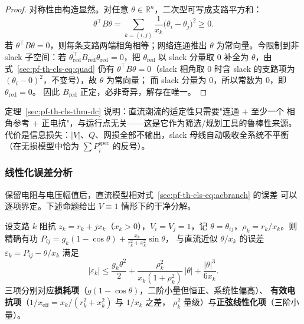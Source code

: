 \begin{proof}
对称性由构造显然。对任意 $\theta\in\mathbb R^{n}$，二次型可写成支路平方和：
\begin{equation}
\theta^{\top}B\theta=\sum_{k=(i,j)}\frac{1}{x_k}\bigl(\theta_i-\theta_j\bigr)^2\ge0.
\label{sec:pf-th-cls-eq:quad}
\end{equation}
若 $\theta^{\top}B\theta=0$，则每条支路两端相角相等；网络连通推出
$\theta$ 为常向量。今限制到非 slack 子空间：若
$\theta_{\mathrm{red}}^{\top}B_{\mathrm{red}}\theta_{\mathrm{red}}=0$，把
$\theta_{\mathrm{red}}$ 以 slack 分量取 $0$ 补全为 $\theta$，由
式~\eqref{sec:pf-th-cls-eq:quad} 仍有 $\theta^{\top}B\theta=0$（slack 相角取 0
时含 slack 的支路项为 $(\theta_i-0)^2$，不变号），故 $\theta$ 为常向量；
而 slack 分量为 $0$，所以常数为 $0$，即 $\theta_{\mathrm{red}}=0$。
因此 $B_{\mathrm{red}}$ 正定，必非奇异，解存在唯一。
\end{proof}

\begin{remark}\label{sec:pf-th-cls-rem-dcslack}
定理~\ref{sec:pf-th-cls-thm-dc} 说明：直流潮流的适定性只需要"连通 + 至少一个
相角参考 + 正电抗"，与运行点无关——这是它作为筛选/规划工具的鲁棒性来源。
代价是信息损失：$|V|$、$Q$、网损全部不输出，slack 母线自动吸收全系统不平衡
（在无损模型中恰为 $\sum P_i^{\mathrm{spec}}$ 的反号）。
\end{remark}

\subsubsection{线性化误差分析}

保留电阻与电压幅值后，直流模型相对式~\eqref{sec:pf-th-cls-eq:acbranch} 的误差
可以逐项界定。下述命题给出 $V\equiv1$ 情形下的干净分解。

\begin{proposition}[直流潮流支路线性化误差界]\label{sec:pf-th-cls-prop-dcerr}
设支路 $k$ 阻抗 $z_k=r_k+jx_k$（$x_k>0$），$V_i=V_j=1$，记
$\theta=\theta_{ij}$，$\rho_k=r_k/x_k$。则精确有功
$P_{ij}=g_k(1-\cos\theta)+\frac{x_k}{r_k^2+x_k^2}\sin\theta$，
与直流近似 $\theta/x_k$ 的误差 $\varepsilon_k=P_{ij}-\theta/x_k$ 满足
\begin{equation}
|\varepsilon_k|
\le \frac{g_k\theta^2}{2}
+\frac{\rho_k^2}{x_k(1+\rho_k^2)}\,|\theta|
+\frac{|\theta|^3}{6x_k}.
\label{sec:pf-th-cls-eq:dcerr}
\end{equation}
三项分别对应\textbf{损耗项}（$g(1-\cos\theta)$，二阶小量但恒正、系统性偏高）、
\textbf{有效电抗项}（$1/x_{\mathrm{eff}}=x_k/(r_k^2+x_k^2)$ 与 $1/x_k$ 之差，
$\rho_k^2$ 量级）与\textbf{正弦线性化项}（三阶小量）。
\end{proposition}

